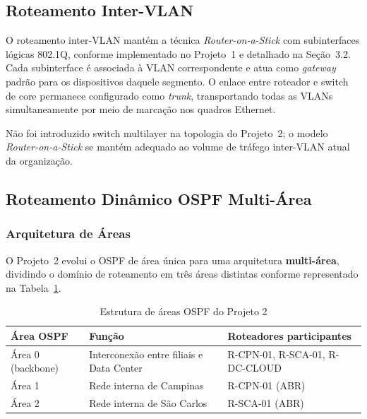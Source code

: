 \documentclass[12pt,a4paper]{article}
\begin{document}
\subsection{Roteamento Inter-VLAN}

O roteamento inter-VLAN mantém a técnica \textit{Router-on-a-Stick} com
subinterfaces lógicas 802.1Q, conforme implementado no Projeto~1 e detalhado na
Seção~3.2. Cada subinterface é associada à VLAN correspondente e atua como
\textit{gateway} padrão para os dispositivos daquele segmento. O enlace entre
roteador e switch de core permanece configurado como \textit{trunk}, transportando
todas as VLANs simultaneamente por meio de marcação nos quadros Ethernet.

Não foi introduzido switch multilayer na topologia do Projeto~2; o modelo
\textit{Router-on-a-Stick} se mantém adequado ao volume de tráfego inter-VLAN
atual da organização.

\subsection{Roteamento Dinâmico OSPF Multi-Área}

\subsubsection{Arquitetura de Áreas}

O Projeto~2 evolui o OSPF de área única para uma arquitetura \textbf{multi-área},
dividindo o domínio de roteamento em três áreas distintas conforme representado na
Tabela~\ref{tab:ospf_areas}.

\begin{table}[H]
\centering
\caption{Estrutura de áreas OSPF do Projeto 2}
\label{tab:ospf_areas}
\begin{tabularx}{\textwidth}{@{}llX@{}}
\toprule
\textbf{Área OSPF} & \textbf{Função} & \textbf{Roteadores participantes} \\ \midrule
Área 0 (backbone) & Interconexão entre filiais e Data Center &
    R-CPN-01, R-SCA-01, R-DC-CLOUD \\
Área 1 & Rede interna de Campinas &
    R-CPN-01 (ABR) \\
Área 2 & Rede interna de São Carlos &
    R-SCA-01 (ABR) \\ \bottomrule
\end{tabularx}
\end{table}
\end{document}
